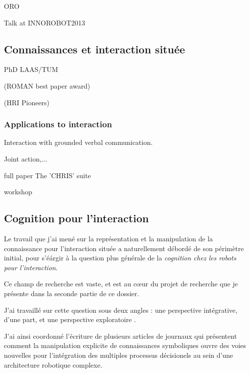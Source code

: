 \documentclass[a4paper]{article}
\begin{document}
\cite{Lemaignan2010} ORO

Talk at INNOROBOT2013

\cite{lemaignan2013explicit}


\subsection{Connaissances et interaction située%
  \label{semantic-tools-for-grounded-interaction}%
}

PhD LAAS/TUM

\cite{ros2010which} (ROMAN best paper award)

\cite{Lemaignan2011} (HRI Pioneers)


\subsubsection{Applications to interaction%
  \label{applications-to-interaction}%
}

Interaction with grounded verbal communication.

\cite{Lemaignan2011a}

\cite{Ros2010a}
\cite{lemaignan2011what}
\cite{lemaignan2011dialogue}
\cite{lemaignan2013talking}

Joint action,...

full paper
The 'CHRIS' suite
\cite{Lallee2010b, Lallee2011, Lallee2012}

workshop
\cite{gharbi2013natural}
\cite{clodic2013on}

\subsection{Cognition pour l'interaction%
  \label{cognition-for-interaction}%
}

Le travail que j'ai mené sur la représentation et la manipulation de la
connaissance pour l'interaction située a naturellement débordé de son périmètre
initial, pour s'éárgir à la question plus générale de la \emph{cognition chez
les robots pour l'interaction}.

Ce champ de recherche est vaste, et est au c\oe ur du projet de recherche que je
présente dans la seconde partie de ce dossier.

J'ai travaillé sur cette question sous deux angles : une perspective
intégrative, d'une part, et une perspective exploratoire .

J'ai ainsi coordonné l'écriture de plusieurs articles de journaux
\cite{alami2011when, Lemaignan2012, lemaignan2014human} qui présentent comment
la manipulation explicite de connaissances symboliques ouvre des voies nouvelles
pour l'intégration des multiples processus décisionels au sein d'une
architecture robotique complexe.
\end{document}
